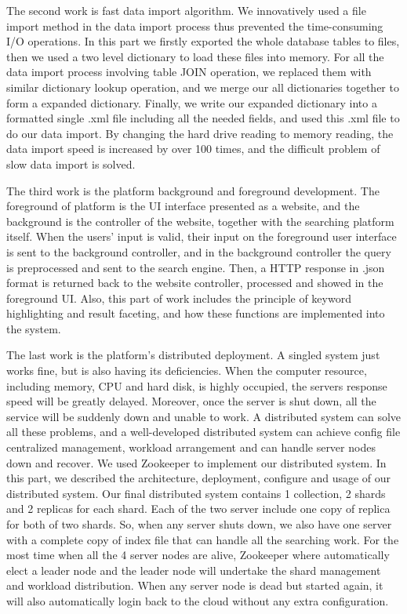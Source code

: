 \begin{bigabstract}
The second work is fast data import algorithm. We innovatively used a file import method in the data import process thus prevented the time-consuming I/O operations. In this part we firstly exported the whole database tables to files, then we used a two level dictionary to load these files into memory. For all the data import process involving table JOIN operation, we replaced them with similar dictionary lookup operation, and we merge our all dictionaries together to form a expanded dictionary. Finally, we write our expanded dictionary into a formatted single .xml file including all the needed fields, and used this .xml file to do our data import. By changing the hard drive reading to memory reading, the data import speed is increased by over 100 times, and the difficult problem of slow data import is solved.

The third work is the platform background and foreground development. The foreground of platform is the UI interface presented as a website, and the background is the controller of the website, together with the searching platform itself. When the users' input is valid, their input on the foreground user interface is sent to the background controller, and in the background controller the query is preprocessed and sent to the search engine. Then, a HTTP response in .json format is returned back to the website controller, processed and showed in the foreground UI. Also, this part of work includes the principle of keyword highlighting and result faceting, and how these functions are implemented into the system.

The last work is the platform's distributed deployment. A singled system just works fine, but is also having its deficiencies. When the computer resource, including memory, CPU and hard disk, is highly occupied, the servers response speed will be greatly delayed. Moreover, once the server is shut down, all the service will be suddenly down and unable to work. A distributed system can solve all these problems, and a well-developed distributed system can achieve config file centralized management, workload arrangement and can handle server nodes down and recover. We used Zookeeper to implement our distributed system. In this part, we described the architecture, deployment, configure and usage of our distributed system. Our final distributed system contains 1 collection, 2 shards and 2 replicas for each shard. Each of the two server include one copy of replica for both of two shards. So, when any server shuts down, we also have one server with a complete copy of index file that can handle all the searching work. For the most time when all the 4 server nodes are alive, Zookeeper where automatically elect a leader node and the leader node will undertake the shard management and workload distribution. When any server node is dead but started again, it will also automatically login back to the cloud without any extra configuration.


\end{bigabstract}
